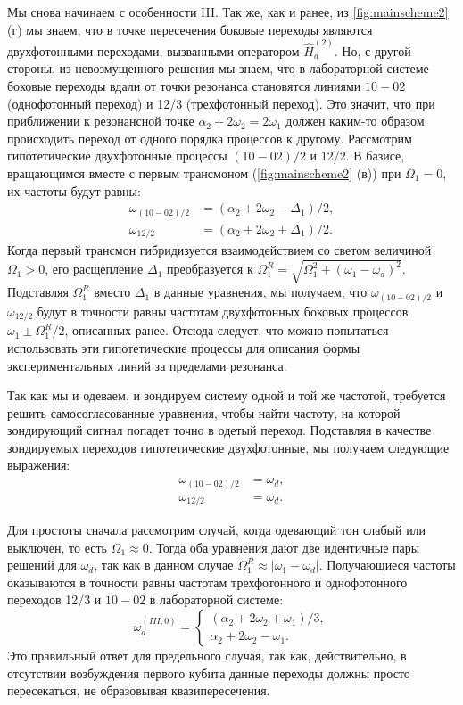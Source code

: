 \documentclass[14pt, a4paper]{extreport}
\numberwithin{equation}{section}
\begin{document}
Мы снова начинаем с особенности III. Так же, как и ранее, из \autoref{fig:mainscheme2} (г) мы знаем, что в точке пересечения боковые переходы являются двухфотонными переходами, вызванными оператором $\hat H_d^{(2)}$. Но, с другой стороны, из невозмущенного решения мы знаем, что в лабораторной системе боковые переходы вдали от точки резонанса становятся линиями $ 10-02 $ (однофотонный переход) и 12/3 (трехфотонный переход). Это значит, что при приближении к резонансной точке $\alpha_2 + 2\omega_2 = 2\omega_1$ должен каким-то образом происходить переход от одного порядка процессов к другому. Рассмотрим гипотетические двухфотонные процессы $ (10-02)/2 $ и 12/2. В базисе, вращающимся вместе с первым трансмоном (\autoref{fig:mainscheme2} (в)) при $\Omega_1 = 0$, их частоты будут равны:
\begin{align}
\omega_{(10-02)/2} &= (\alpha_2 + 2 \omega_{2} - \Delta_1)/2,
\label{eq:two-photon_lab1002}\\
\omega_{12/2} &= (\alpha_2 + 2 \omega_{2} + \Delta_1)/2.
\label{eq:two-photon_lab12}
\end{align}
Когда первый трансмон гибридизуется взаимодействием со светом величиной $\Omega_{1} > 0$, его расщепление $\Delta_1$ преобразуется к $\Omega_1^R = \sqrt{\Omega_1^2 + (\omega_1 - \omega_d)^2}$. Подставляя $\Omega_1^R$ вместо $\Delta_1$ в данные уравнения, мы получаем, что $\omega_{(10-02)/2}$ и $\omega_{12/2}$ будут в точности равны частотам двухфотонных боковых процессов $\omega_1 \pm \Omega_1^R/2$, описанных ранее. Отсюда следует, что можно попытаться использовать эти гипотетические процессы для описания формы экспериментальных линий за пределами резонанса.

Так как мы и одеваем, и зондируем систему одной и той же частотой, требуется решить самосогласованные уравнения, чтобы найти частоту, на которой зондирующий сигнал попадет точно в одетый переход. Подставляя в качестве зондируемых переходов гипотетические двухфотонные, мы получаем следующие выражения:
\begin{equation}
\begin{aligned}
\omega_{(10-02)/2} &= \omega_d,\\
\omega_{12/2} &= \omega_d.
\end{aligned}
\label{eq:two-photon}
\end{equation}

Для простоты сначала рассмотрим случай, когда одевающий тон слабый или выключен, то есть $\Omega_1 \approx 0$. Тогда оба уравнения дают две идентичные пары решений для $\omega_d$, так как в данном случае $\Omega_1^R \approx |\omega_1 - \omega_d| $. Получающиеся частоты оказываются в точности равны частотам трехфотонного и однофотонного переходов 12/3 и $ 10-02 $ в лабораторной системе:
\begin{equation}
\omega_d^{(III, 0)} = \begin{cases} (\alpha_2 + 2\omega_2 + \omega_1)/3, \\ \alpha_2 + 2 \omega_{2} - \omega_{1}.\end{cases}
\end{equation}
Это правильный ответ для предельного случая, так как, действительно, в отсутствии возбуждения первого кубита данные переходы должны просто пересекаться, не образовывая квазипересечения.
\end{document}
